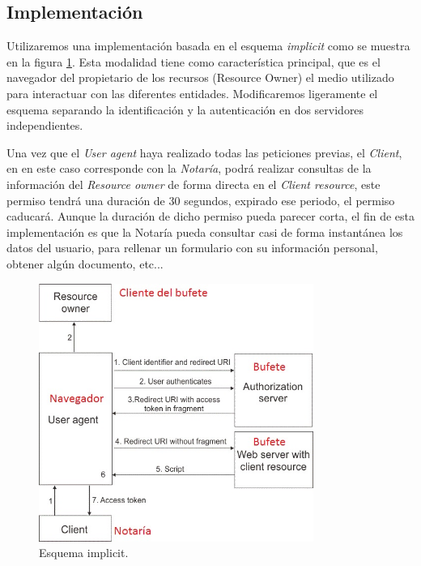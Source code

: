 \documentclass[a4,12pt,onecolum]{article}
\begin{document}

\subsection{Implementación}
Utilizaremos una implementación basada en el esquema \emph{implicit} como se muestra en la figura \ref{fig:oauth1}. Esta modalidad tiene como característica principal, que es el navegador del propietario de los recursos (Resource Owner) el medio utilizado para interactuar con las diferentes entidades. Modificaremos ligeramente el esquema separando la identificación y la autenticación en dos servidores independientes.

Una vez que el \emph{User agent} haya realizado todas las peticiones previas, el \emph{Client}, en en este caso corresponde con la \emph{Notaría}, podrá realizar consultas de la información del \emph{Resource owner} de forma directa en el \emph{Client resource}, este permiso tendrá una duración de 30 segundos, expirado ese periodo, el permiso caducará. Aunque la duración de dicho permiso pueda parecer corta, el fin de esta implementación es que la Notaría pueda consultar casi de forma instantánea los datos del usuario, para rellenar  un formulario con su información personal, obtener algún documento, etc... \\

\begin{figure}[htbp]
\centering
\includegraphics[width=0.8\textwidth]{./images/oauth/implicit.jpg}
\caption{Esquema implicit.}
\label{fig:oauth1}
\end{figure}
\end{document}
